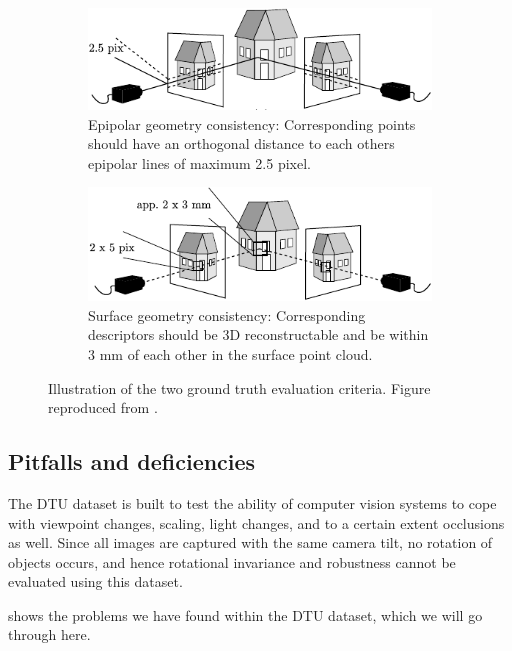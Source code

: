 \documentclass[thesis.tex]{subfiles}
\begin{document}
\begin{figure}[tb]
	\centering
	\begin{subfigure}[t]{0.8\textwidth}
		\includegraphics[width=\textwidth]{img/icEval1GT.pdf}
		\caption{Epipolar geometry consistency: Corresponding points should have an orthogonal distance to each others epipolar lines of maximum 2.5 pixel.}
		\label{fig:icEval1GT}
	\end{subfigure}
	\begin{subfigure}[t]{0.8\textwidth}
		\includegraphics[width=\textwidth]{img/icEval2GT.pdf}
		\caption{Surface geometry consistency: Corresponding descriptors should be 3D reconstructable and be within 3 mm of each other in the surface point cloud.}
		\label{fig:icEval2GT}
	\end{subfigure}
	\caption{Illustration of the two ground truth evaluation criteria. Figure reproduced from \cite[Figure 5 (a-b),pp. 4]{aanaes2010recall}.}
	\label{fig:icEvalGT}
\end{figure}

%
\subsection{Pitfalls and deficiencies}
The DTU dataset is built to test the ability of computer vision systems to cope with viewpoint changes, scaling, light changes, and to a certain extent occlusions as well. Since all images are captured with the same camera tilt, no rotation of objects occurs, and hence rotational invariance and robustness cannot be evaluated using this dataset.

 shows the problems we have found within the DTU dataset, which we will go through here.
\end{document}
